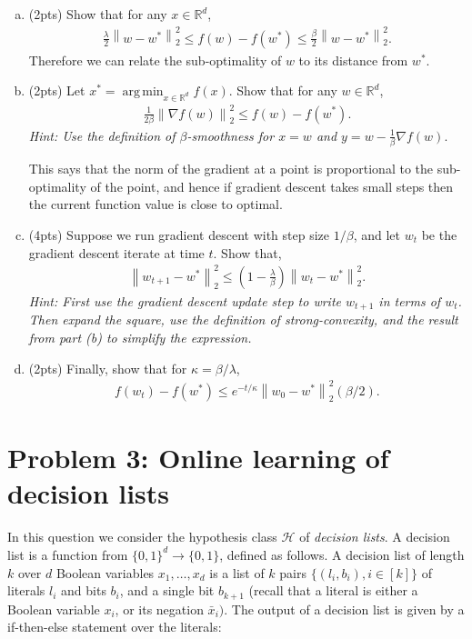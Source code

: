 \documentclass[11pt]{article}
\DeclareMathOperator*{\argmin}{arg\,min}
\newcommand{\calH}{{\mathcal{H}}}
\newcommand{\blue}[1]{{\color{blue}#1}}
\newcommand{\R}{\mathbb{R}}
\newcommand{\twonorm}[1]{\left\| #1\right\|_2}
\begin{document}
\begin{enumerate}[(a)]
    
    \item (\blue{2pts}) Show that for any $x\in \R^d$,
    \begin{align*}
       \frac{\lambda}{2} \twonorm{w-w^*}^2 \le f(w)-f(w^*) \le \frac{\beta}{2}\twonorm{w-w^*}^2.
    \end{align*}
    Therefore we can relate the sub-optimality of $w$ to its distance from $w^*$.
    \item (\blue{2pts}) Let $x^*=\argmin_{x\in \R^d} f(x)$. Show that for any $w\in \R^d$,
    \begin{align*}
       \frac{1}{2\beta} \twonorm{\nabla f(w)}^2 \le f(w)-f(w^*) .
    \end{align*}
    \emph{Hint: Use the definition of $\beta$-smoothness for $x=w$ and $y=w-\frac{1}{\beta}\nabla f(w)$}.
    
    This says that the norm of the gradient at a point is proportional to the sub-optimality of the point, and hence if gradient descent  takes small steps then the current function value is close to optimal.
    \item (\blue{4pts}) Suppose we run gradient descent with step size $1/\beta$, and let $w_t$ be the gradient descent iterate at time $t$. Show that,
    \begin{align*}
        \twonorm{w_{t+1}-w^*}^2 \le \left(1-\frac{\lambda}{\beta}\right)\twonorm{w_{t}-w^*}^2.
    \end{align*}
    \emph{Hint: First use the gradient descent update step to write $w_{t+1}$ in terms of $w_t$. Then expand the square, use the definition of strong-convexity, and the result from part (b) to simplify the expression.}
    \item (\blue{2pts}) Finally, show that for $\kappa=\beta/\lambda$,
    \begin{align*}
        f(w_t)-f(w^*) \le e^{-t/\kappa}\twonorm{w_0-w^*}^2(\beta/2).
    \end{align*}
    
\end{enumerate}

\section*{Problem 3: Online learning of decision lists}

In this question we consider the hypothesis class $\calH$ of \emph{decision lists}. A decision list is a function from $\{0,1\}^d \rightarrow \{0,1\}$, defined as follows. A decision list of length $k$ over $d$ Boolean variables $x_1,\dots, x_d$ is a list of $k$ pairs $\{(l_i,b_i), i \in [k]\}$ of literals $l_i$ and bits $b_i$, and a single bit $b_{k+1}$ (recall that a literal is either a Boolean variable $x_i$, or its negation $\bar{x}_i)$. The output of a decision list is given by a if-then-else statement over the literals:
\end{document}

